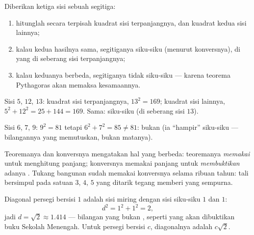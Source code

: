 \begin{method}\label{met:g8:pythagoras:test}
Diberikan ketiga sisi sebuah segitiga:
\begin{enumerate}
  \item hitunglah secara terpisah kuadrat sisi terpanjangnya, dan
         kuadrat kedua sisi lainnya;
  \item kalau kedua hasilnya sama, segitiganya siku-siku (menurut
        konversnya), di  yang di seberang sisi
        terpanjangnya;
  \item kalau keduanya berbeda, segitiganya tidak siku-siku ---
        karena teorema Pythagoras akan memaksa kesamaannya.
\end{enumerate}
\end{method}

\begin{example}\label{ex:g8:pythagoras:test}
Sisi $5$, $12$, $13$: kuadrat sisi terpanjangnya, $13^2 = 169$; 
kuadrat sisi lainnya, $5^2 + 12^2 = 25 + 144 = 169$. Sama: siku-siku
(di seberang sisi $13$).

Sisi $6$, $7$, $9$: $9^2 = 81$ tetapi $6^2 + 7^2 = 85 \neq 81$: bukan
 (ia ``hampir'' siku-siku --- bilangannya yang
memutuskan, bukan matanya).
\end{example}

\begin{remark}
Teoremanya dan konversnya mengatakan hal yang berbeda: teoremanya
\emph{memakai}  untuk menghitung panjang; konversnya
memakai panjang untuk \emph{membuktikan} adanya .
Tukang bangunan sudah memakai konversnya selama ribuan tahun: tali
bersimpul pada satuan $3$, $4$, $5$ yang ditarik tegang memberi  yang sempurna.
\end{remark}

\begin{example}\label{ex:g8:pythagoras:diagonal}
Diagonal persegi bersisi $1$ adalah sisi miring 
dengan sisi siku-siku $1$ dan $1$:
\[
d^2 = 1^2 + 1^2 = 2 ,
\]
jadi $d = \sqrt2 \approx 1.414$ --- bilangan yang bukan ,
seperti yang akan dibuktikan buku Sekolah Menengah. Untuk persegi
bersisi $c$, diagonalnya adalah $c\sqrt2$.
\end{example}

